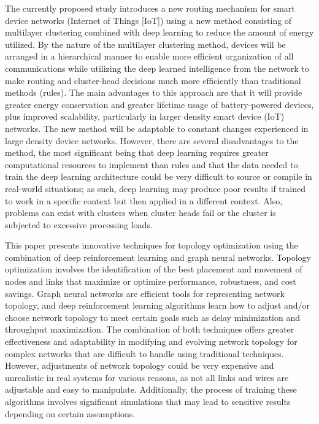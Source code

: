 \documentclass[a4paper,fleqn]{cas-dc}
\numberwithin{equation}{section}
\begin{document}
The currently proposed study \cite{Manikantha20251031} introduces a new routing mechanism for smart device networks (Internet of Things [IoT]) using a new method consisting of multilayer clustering combined with deep learning to reduce the amount of energy utilized. By the nature of the multilayer clustering method, devices will be arranged in a hierarchical manner to enable more efficient organization of all communications while utilizing the deep learned intelligence from the network to make routing and cluster-head decisions much more efficiently than traditional methods (rules). The main advantages to this approach are that it will provide greater energy conservation and greater lifetime usage of battery-powered devices, plus improved scalability, particularly in larger density smart device (IoT) networks. The new method will be adaptable to constant changes experienced in large density device networks. However, there are several disadvantages to the method, the most significant being that deep learning requires greater computational resources to implement than rules and that the data needed to train the deep learning architecture could be very difficult to source or compile in real-world situations; as such, deep learning may produce poor results if trained to work in a specific context but then applied in a different context. Also, problems can exist with clusters when cluster heads fail or the cluster is subjected to excessive processing loads.

This paper \cite{Ali202585447} presents innovative techniques for topology optimization using the combination of deep reinforcement learning and graph neural networks. Topology optimization involves the identification of the best placement and movement of nodes and links that maximize or optimize performance, robustness, and cost savings. Graph neural networks are efficient tools for representing network topology, and deep reinforcement learning algorithms learn how to adjust and/or choose network topology to meet certain goals such as delay minimization and throughput maximization. The combination of both techniques offers greater effectiveness and adaptability in modifying and evolving network topology for complex networks that are difficult to handle using traditional techniques. However, adjustments of network topology could be very expensive and unrealistic in real systems for various reasons, as not all links and wires are adjustable and easy to manipulate. Additionally, the process of training these algorithms involves significant simulations that may lead to sensitive results depending on certain assumptions.
\end{document}
